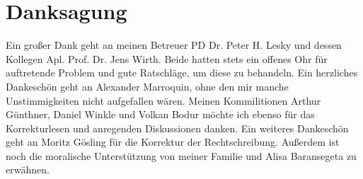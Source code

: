\section*{Danksagung}
Ein großer Dank geht an meinen Betreuer PD Dr. Peter H. Lesky und dessen Kollegen Apl. Prof. Dr. Jens Wirth.
Beide hatten stets ein offenes Ohr für auftretende Problem und gute Ratschläge, um diese zu behandeln.
Ein herzliches Dankeschön geht an Alexander Marroquin, ohne den mir manche Unstimmigkeiten nicht aufgefallen wären.
Meinen Kommilitionen Arthur Günthner, Daniel Winkle und Volkan Bodur möchte ich ebenso für das Korrekturlesen und anregenden Diskussionen danken.
Ein weiteres Dankeschön geht an Moritz Gösling für die Korrektur der Rechtschreibung.
Außerdem ist noch die moralische Unterstützung von meiner Familie und Alisa Baransegeta zu erwähnen.
